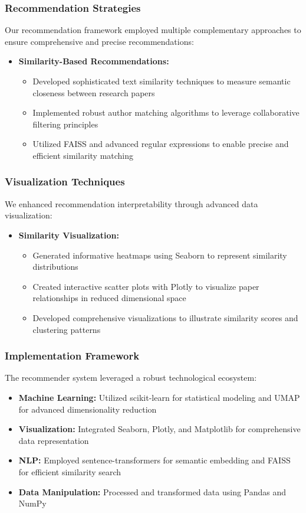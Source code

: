 \documentclass[runningheads]{llncs}
\begin{document}
\subsubsection*{Recommendation Strategies}
Our recommendation framework employed multiple complementary approaches to ensure comprehensive and precise recommendations:
\begin{itemize}
\item \textbf{Similarity-Based Recommendations:}
\begin{itemize}
\item Developed sophisticated text similarity techniques to measure semantic closeness between research papers
\item Implemented robust author matching algorithms to leverage collaborative filtering principles
\item Utilized FAISS and advanced regular expressions to enable precise and efficient similarity matching
\end{itemize}
\end{itemize}
\subsubsection*{Visualization Techniques}
We enhanced recommendation interpretability through advanced data visualization:
\begin{itemize}
\item \textbf{Similarity Visualization:}
\begin{itemize}
\item Generated informative heatmaps using Seaborn to represent similarity distributions
\item Created interactive scatter plots with Plotly to visualize paper relationships in reduced dimensional space
\item Developed comprehensive visualizations to illustrate similarity scores and clustering patterns
\end{itemize}
\end{itemize}
\subsubsection*{Implementation Framework}
The recommender system leveraged a robust technological ecosystem:
\begin{itemize}
\item \textbf{Machine Learning:} Utilized scikit-learn for statistical modeling and UMAP for advanced dimensionality reduction
\item \textbf{Visualization:} Integrated Seaborn, Plotly, and Matplotlib for comprehensive data representation
\item \textbf{NLP:} Employed sentence-transformers for semantic embedding and FAISS for efficient similarity search
\item \textbf{Data Manipulation:} Processed and transformed data using Pandas and NumPy
\end{itemize}
\end{document}
